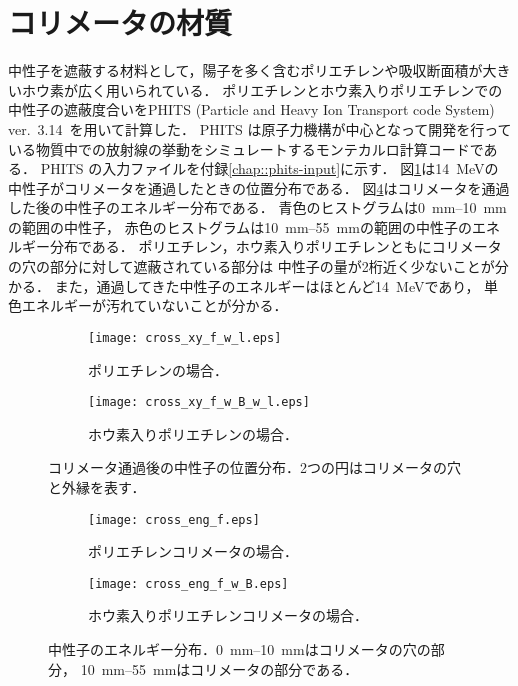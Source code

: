 \documentclass[../master]{subfiles}
\begin{document}
\section{コリメータの材質}
中性子を遮蔽する材料として，陽子を多く含むポリエチレンや吸収断面積が大きいホウ素が広く用いられている．
ポリエチレンとホウ素入りポリエチレンでの中性子の遮蔽度合いをPHITS (Particle and Heavy Ion Transport code System)
ver.~3.14~\cite{phits}を用いて計算した．
PHITS は原子力機構が中心となって開発を行っている物質中での放射線の挙動をシミュレートするモンテカルロ計算コードである．
PHITS の入力ファイルを付録\ref{chap::phits-input}に示す．
図\ref{collimator_xy_pos}は\SI{14}{\mega\electronvolt}の中性子がコリメータを通過したときの位置分布である．
図\ref{fig::neutron_energy}はコリメータを通過した後の中性子のエネルギー分布である．
青色のヒストグラムは\SIrange{0}{10}{\milli\metre}の範囲の中性子，
赤色のヒストグラムは\SIrange{10}{55}{\milli\metre}の範囲の中性子のエネルギー分布である．
ポリエチレン，ホウ素入りポリエチレンともにコリメータの穴の部分に対して遮蔽されている部分は
中性子の量が2桁近く少ないことが分かる．
また，通過してきた中性子のエネルギーはほとんど\SI{14}{\mega\electronvolt}であり，
単色エネルギーが汚れていないことが分かる．
\begin{figure}
  \centering
  \begin{subfigure}{\columnwidth}
    \centering
    \texttt{[image: cross\_xy\_f\_w\_l.eps]}
    \caption{ポリエチレンの場合．}
  \end{subfigure}
  \begin{subfigure}{\columnwidth}
    \centering
    \texttt{[image: cross\_xy\_f\_w\_B\_w\_l.eps]}
    \caption{ホウ素入りポリエチレンの場合．}
  \end{subfigure}
  \caption[コリメータ通過後の中性子の位置分布．]
          {コリメータ通過後の中性子の位置分布．2つの円はコリメータの穴と外縁を表す．}
  \label{collimator_xy_pos}
\end{figure}
\begin{figure}
  \begin{subfigure}{\columnwidth}
    \centering
    \texttt{[image: cross\_eng\_f.eps]}
    \caption{ポリエチレンコリメータの場合．}
    \label{fig::neutron_energy_dist}
  \end{subfigure}
  \begin{subfigure}{\columnwidth}
    \centering
    \texttt{[image: cross\_eng\_f\_w\_B.eps]}
    \caption{ホウ素入りポリエチレンコリメータの場合．}
    \label{fig::neutron_energy_dist_w_B}
  \end{subfigure}
  \caption[中性子のエネルギー分布．]
          {中性子のエネルギー分布．\SIrange{0}{10}{\milli\metre}はコリメータの穴の部分，
          \SIrange{10}{55}{\milli\metre}はコリメータの部分である．}
  \label{fig::neutron_energy}
\end{figure}
\end{document}
